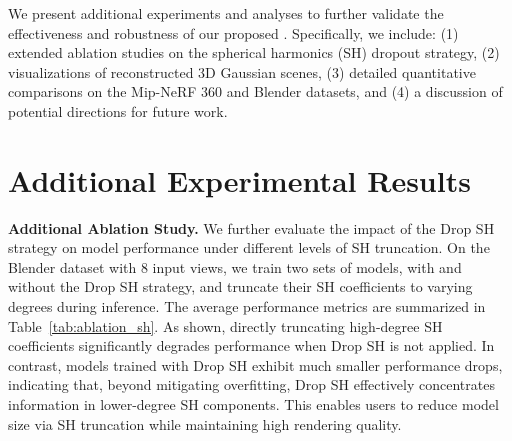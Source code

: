 
\clearpage
\setcounter{page}{1}
\maketitlesupplementary

We present additional experiments and analyses to further validate the effectiveness and robustness of our proposed \methodname{}. Specifically, we include: (1) extended ablation studies on the spherical harmonics (SH) dropout strategy, (2) visualizations of reconstructed 3D Gaussian scenes, (3) detailed quantitative comparisons on the Mip-NeRF 360 and Blender datasets, and (4) a discussion of potential directions for future work.


\section{Additional Experimental Results}


% 
\begin{table}[ht]
  \centering
  \caption{Effect of with and without Drop SH strategy on the Blender dataset (8 views). The Drop SH strategy encourages the effective parameters to concentrate in lower-degree SH coefficients, thereby mitigating the performance degradation caused by direct SH truncation.}
  \resizebox{0.7\linewidth}{!}{
    
    }
\label{tab:ablation_sh}
\vspace{3mm}
\end{table}

\noindent\textbf{Additional Ablation Study.} We further evaluate the impact of the Drop SH strategy on model performance under different levels of SH truncation. On the Blender dataset with 8 input views, we train two sets of models, with and without the Drop SH strategy, and truncate their SH coefficients to varying degrees during inference. The average performance metrics are summarized in Table~\ref{tab:ablation_sh}. As shown, directly truncating high-degree SH coefficients significantly degrades performance when Drop SH is not applied. In contrast, models trained with Drop SH exhibit much smaller performance drops, indicating that, beyond mitigating overfitting, Drop SH effectively concentrates information in lower-degree SH components. This enables users to reduce model size via SH truncation while maintaining high rendering quality.

